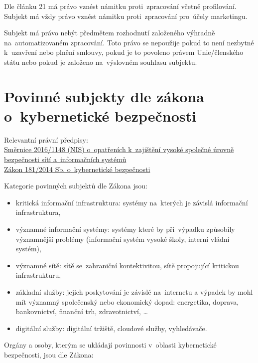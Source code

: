 Dle článku 21 má právo vznést námitku proti~zpracování včetně profilování.
Subjekt má vždy právo vznést námitku proti~zpracování pro~účely marketingu.

Subjekt má právo nebýt předmětem rozhodnutí založeného výhradně na~automatizovaném zpracování.
Toto právo se nepoužije pokud to není nezbytné k~uzavření nebo plnění smlouvy, pokud je to povoleno právem Unie/členského státu nebo pokud je založeno na~výslovném souhlasu subjektu.


\clearpage
\section{Povinné subjekty dle zákona o~kybernetické bezpečnosti}

{}Relevantní právní předpisy:
\\\href{https://eur-lex.europa.eu/legal-content/CS/TXT/?uri=uriserv:OJ.L_.2016.194.01.0001.01.CES
}{Směrnice 2016/1148 (NIS) o~opatřeních k~zajištění vysoké společné úrovně bezpečnosti sítí a~informačních systémů}
\\\href{https://www.zakonyprolidi.cz/cs/2014-181}{Zákon 181/2014 Sb. o~kybernetické bezpečnosti}

Kategorie povinných subjektů dle Zákona jsou:

\begin{itemize}
\item kritická informační infrastruktura: systémy na~kterých je závislá informační infrastruktura,
\item významné informační systémy: systémy které by při~výpadku způsobily významnější problémy (informační systém vysoké školy, interní vládní systém),
\item významné sítě: sítě se~zahraniční kontektivitou, sítě propojující kritickou infrastrukturu,
\item základní služby: jejich poskytování je závislé na~internetu a výpadek by mohl mít významný společenský nebo ekonomický dopad: energetika, doprava, bankovnictví, finanční trh, zdravotnictví, \dots
\item digitální služby: digitální tržiště, cloudové služby, vyhledávače.
\end{itemize}

Orgány a osoby, kterým se ukládají povinnosti v~oblasti kybernetické bezpečnosti, jsou dle Zákona:

